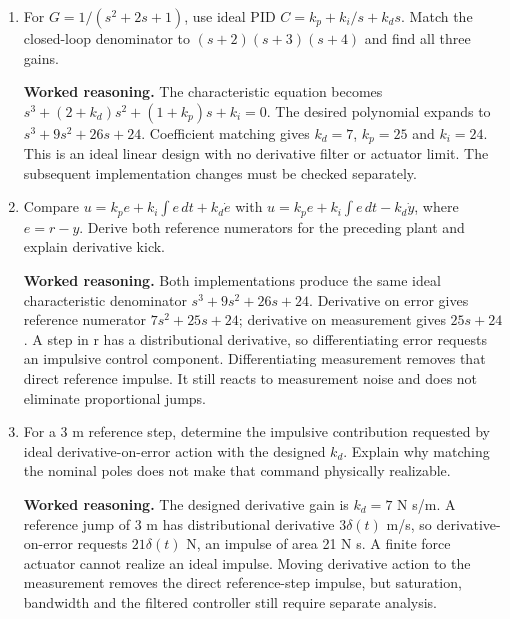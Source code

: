 \documentclass[10pt,a4paper]{article}
\newcommand{\answer}{\par\smallskip\textbf{Worked reasoning.} }
\begin{document}
\begin{enumerate}
\item For $G=1/(s^2+2s+1)$, use ideal PID $C=k_p+k_i/s+k_ds$. Match the closed-loop denominator to $(s+2)(s+3)(s+4)$ and find all three gains.
\answer The characteristic equation becomes $s^3+(2+k_d)s^2+(1+k_p)s+k_i=0$. The desired polynomial expands to $s^3+9s^2+26s+24$. Coefficient matching gives $k_d=7$, $k_p=25$ and $k_i=24$. This is an ideal linear design with no derivative filter or actuator limit. The subsequent implementation changes must be checked separately.
\item Compare $u=k_pe+k_i\int e\,dt+k_d\dot e$ with $u=k_pe+k_i\int e\,dt-k_d\dot y$, where $e=r-y$. Derive both reference numerators for the preceding plant and explain derivative kick.
\answer Both implementations produce the same ideal characteristic denominator $s^3+9s^2+26s+24$. Derivative on error gives reference numerator $7s^2+25s+24$; derivative on measurement gives $25s+24$. A step in r has a distributional derivative, so differentiating error requests an impulsive control component. Differentiating measurement removes that direct reference impulse. It still reacts to measurement noise and does not eliminate proportional jumps.
\item For a 3 m reference step, determine the impulsive contribution requested by ideal derivative-on-error action with the designed $k_d$. Explain why matching the nominal poles does not make that command physically realizable.
\answer The designed derivative gain is $k_d=7$ N s/m. A reference jump of 3 m has distributional derivative $3\delta(t)$ m/s, so derivative-on-error requests $21\delta(t)$ N, an impulse of area 21 N s. A finite force actuator cannot realize an ideal impulse. Moving derivative action to the measurement removes the direct reference-step impulse, but saturation, bandwidth and the filtered controller still require separate analysis.
\end{enumerate}
\end{document}
